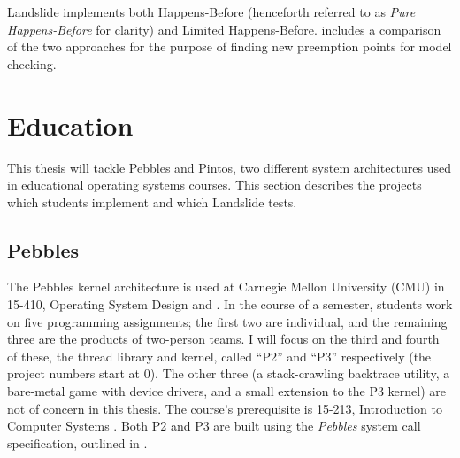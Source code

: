 Landslide implements both Happens-Before (henceforth referred to as {\em Pure Happens-Before} for clarity) and Limited Happens-Before.
 includes a comparison of the two approaches for the purpose of finding new preemption points for model checking.


\section{Education}
\label{sec:overview-edu}

This thesis will tackle Pebbles and Pintos, two different system architectures used in educational operating systems courses.
This section describes the projects which students implement and which Landslide tests.

\subsection{Pebbles}
\label{sec:pebbles}

The Pebbles kernel architecture
is used at Carnegie Mellon University (CMU) in 15-410, Operating System Design and  \cite{kspec,thrlib}.
In the course of a semester, students work on five programming assignments;
the first two are individual, and the remaining three are the products of two-person teams.
I will focus on the third and fourth of these, the thread library and kernel,
called ``P2'' and ``P3'' respectively (the project numbers start at 0).
The other three (a stack-crawling backtrace utility, a bare-metal game with device drivers, and a small extension to the P3 kernel) are not of concern in this thesis.
The course's prerequisite is 15-213, Introduction to Computer Systems \cite{sigcse01:CSaPP,csapp}.
Both P2 and P3 are built using the {\em Pebbles} system call specification, outlined in .

